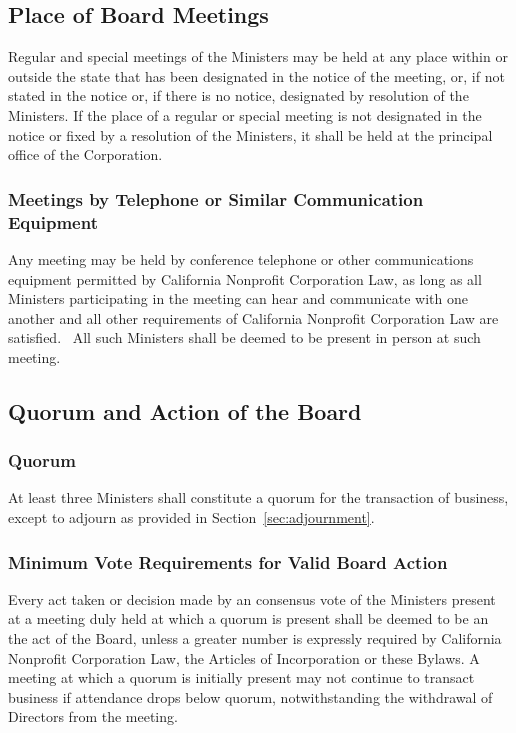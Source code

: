 \documentclass[letterpaper,titlepage]{article}
\begin{document}
\subsection{Place of Board Meetings}
\label{sec:placeMeetings}
Regular and special meetings of the Ministers may be held at any place within or outside the state that has been designated in the notice of the meeting, or, if not stated in the notice or, if there is no notice, designated by resolution of the Ministers. If the place of a regular or special meeting is not designated in the notice or fixed by a resolution of the Ministers, it shall be held at the principal office of the Corporation.  
\subsubsection{Meetings by Telephone or Similar Communication Equipment}
\label{sec:meetingsTelephone}
Any meeting may be held by conference telephone or other communications equipment permitted by California Nonprofit Corporation Law, as long as all Ministers participating in the meeting can hear and communicate with one another and all other requirements of California Nonprofit Corporation Law are satisfied.  All such Ministers shall be deemed to be present in person at such meeting.
\subsection{Quorum and Action of the Board}
\label{sec:quorumAction}
\subsubsection{Quorum}
\label{sec:quorum}
At least three Ministers shall constitute a quorum for the transaction of
business, except to adjourn as provided in Section~\ref{sec:adjournment}.
\subsubsection{Minimum Vote Requirements for Valid Board Action}
\label{sec:minimumVote}
Every act taken or decision made by an consensus vote of the Ministers present at a meeting duly held at which a quorum is present shall be deemed to be an the act of the Board, unless a greater number is expressly required by California Nonprofit Corporation Law, the Articles of Incorporation or these Bylaws. A meeting at which a quorum is initially present may not continue to transact business if attendance drops below quorum, notwithstanding the withdrawal of Directors from the meeting.
\end{document}
